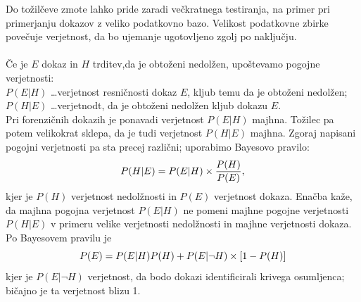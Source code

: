 \documentclass[12pt,a4paper]{amsart}
\theoremstyle{definition} %
\theoremstyle{plain} %
\begin{document}
Do tožilčeve zmote lahko pride zaradi večkratnega testiranja, na primer pri primerjanju dokazov z veliko podatkovno bazo. Velikost podatkovne
zbirke povečuje verjetnost, da bo ujemanje ugotovljeno zgolj po naključju. \\\\
Če je $E$ dokaz in $H$ trditev,da je obtoženi nedolžen, upoštevamo pogojne verjetnosti: \\
$P(E \lvert H)$ \dots verjetnost resničnosti dokaz $E$, kljub temu da je obtoženi nedolžen; \\
$P(H \lvert E)$ \dots verjetnodt, da je obtoženi nedolžen kljub dokazu $E$. \\
Pri forenzičnih dokazih je ponavadi verjetnost $P(E \lvert H)$ majhna. Tožilec pa potem velikokrat sklepa, da je tudi verjetnost
$P(H \lvert E)$ majhna.
Zgoraj napisani pogojni verjetnosti pa sta precej različni; uporabimo Bayesovo pravilo:
\[
   P(H \lvert E) = P(E \lvert H) \times \frac{P(H)}{P(E)}, \vspace{2mm}
\]
kjer je $P(H)$ verjetnost nedolžnosti in $P(E)$ verjetnost dokaza. Enačba kaže, da majhna pogojna verjetnost $P(E \lvert H)$ ne pomeni majhne
pogojne verjetnosti $P(H \lvert E)$ v primeru velike verjetnosti nedolžnosti in majhne verjetnosti dokaza. \\
Po Bayesovem pravilu je
\[
   P(E)=P(E \lvert H)P(H) + P(E \lvert \neg H)\times[1 - P(H)] \vspace{2mm}
\]
kjer je $P(E \lvert \neg H)$ verjetnost, da bodo dokazi identificirali krivega osumljenca; bičajno je ta verjetnost blizu 1.
\end{document}
